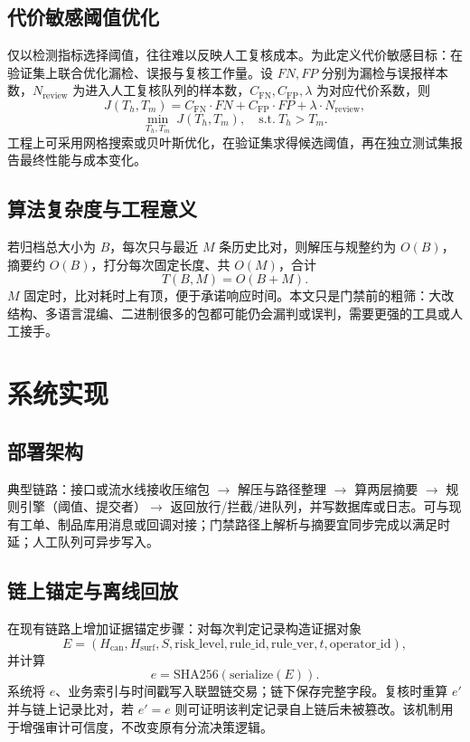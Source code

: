 \documentclass[UTF8,a4paper,zihao=5]{ctexart}
\begin{document}
\subsection{代价敏感阈值优化}
仅以检测指标选择阈值，往往难以反映人工复核成本。为此定义代价敏感目标：在验证集上联合优化漏检、误报与复核工作量。设 $FN,FP$ 分别为漏检与误报样本数，$N_{\mathrm{review}}$ 为进入人工复核队列的样本数，$C_{\mathrm{FN}},C_{\mathrm{FP}},\lambda$ 为对应代价系数，则
\begin{equation}
J(T_h,T_m)=C_{\mathrm{FN}}\cdot FN + C_{\mathrm{FP}}\cdot FP + \lambda\cdot N_{\mathrm{review}},
\end{equation}
\begin{equation}
\min_{T_h,T_m}\ J(T_h,T_m),\quad \text{s.t.}\ T_h>T_m.
\end{equation}
工程上可采用网格搜索或贝叶斯优化，在验证集求得候选阈值，再在独立测试集报告最终性能与成本变化。

\subsection{算法复杂度与工程意义}
若归档总大小为 $B$，每次只与最近 $M$ 条历史比对，则解压与规整约为 $O(B)$，摘要约 $O(B)$，打分每次固定长度、共 $O(M)$，合计
\begin{equation}
T(B,M)=O(B+M).
\end{equation}
$M$ 固定时，比对耗时上有顶，便于承诺响应时间。本文只是门禁前的粗筛：大改结构、多语言混编、二进制很多的包都可能仍会漏判或误判，需要更强的工具或人工接手。

\section{系统实现}
\label{sec:impl}

\subsection{部署架构}
典型链路：接口或流水线接收压缩包 $\rightarrow$ 解压与路径整理 $\rightarrow$ 算两层摘要 $\rightarrow$ 规则引擎（阈值、提交者）$\rightarrow$ 返回放行/拦截/进队列，并写数据库或日志。可与现有工单、制品库用消息或回调对接；门禁路径上解析与摘要宜同步完成以满足时延；人工队列可异步写入。

\subsection{链上锚定与离线回放}
在现有链路上增加证据锚定步骤：对每次判定记录构造证据对象
\[
E=(H_{\mathrm{can}},H_{\mathrm{surf}},S,\text{risk\_level},\text{rule\_id},\text{rule\_ver},t,\text{operator\_id}),
\]
并计算
\[
e=\mathrm{SHA256}(\mathrm{serialize}(E)).
\]
系统将 $e$、业务索引与时间戳写入联盟链交易；链下保存完整字段。复核时重算 $e'$ 并与链上记录比对，若 $e'=e$ 则可证明该判定记录自上链后未被篡改。该机制用于增强审计可信度，不改变原有分流决策逻辑。
\end{document}
